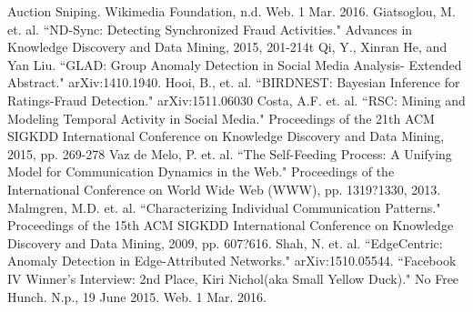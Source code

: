 \documentclass{article} %
\begin{document}
\begin{thebibliography}{123}

 Auction Sniping. Wikimedia Foundation, n.d. Web. 1 Mar. 2016.
 Giatsoglou, M. et. al. ``ND-Sync: Detecting Synchronized Fraud Activities." Advances in Knowledge Discovery and Data Mining, 2015, 201-214t
 Qi, Y., Xinran He, and Yan Liu. ``GLAD: Group Anomaly Detection in Social Media Analysis- Extended Abstract." arXiv:1410.1940.
 Hooi, B., et. al. ``BIRDNEST: Bayesian Inference for Ratings-Fraud Detection." arXiv:1511.06030
 Costa, A.F. et. al. ``RSC: Mining and Modeling Temporal Activity in Social Media." Proceedings of the 21th ACM SIGKDD International Conference on Knowledge Discovery and Data Mining, 2015, pp. 269-278
 Vaz de Melo, P. et. al. ``The Self-Feeding Process: A Unifying Model for Communication Dynamics in the Web." Proceedings of the International Conference on World Wide Web (WWW), pp. 1319?1330, 2013.
 Malmgren, M.D. et. al. ``Characterizing Individual Communication Patterns." Proceedings of the 15th ACM SIGKDD International Conference on Knowledge Discovery and Data Mining, 2009, pp. 607?616.
 Shah, N. et. al. ``EdgeCentric: Anomaly Detection in Edge-Attributed Networks." arXiv:1510.05544.
 ``Facebook IV Winner's Interview: 2nd Place, Kiri Nichol(aka Small Yellow Duck)." No Free Hunch. N.p., 19 June 2015. Web. 1 Mar. 2016.

\end{thebibliography}
\end{document}
